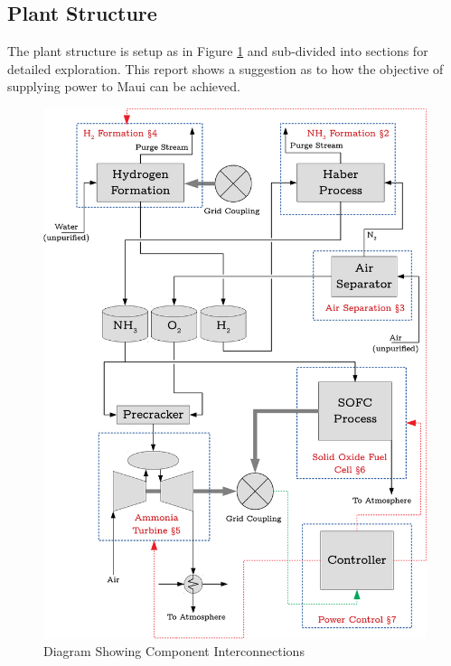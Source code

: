 \subsection{Plant Structure}

The plant structure is setup as in Figure \ref{fig:plantglobaldiagram} and sub-divided into sections for detailed exploration.
This report shows a suggestion as to how the objective of supplying power to Maui can be achieved. 

\begin{figure}[hb]
        \centering
        \includegraphics[scale=0.7]{plantdiagram.pdf}
        \caption{Diagram Showing Component Interconnections}
        \label{fig:plantglobaldiagram}
\end{figure}

